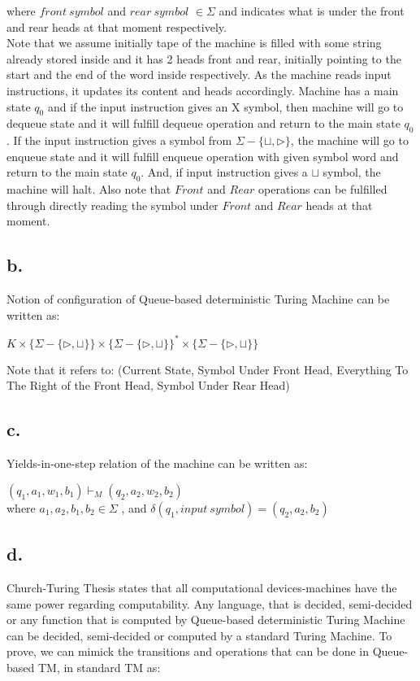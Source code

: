 \documentclass[12pt]{article}
\begin{document}
where $front \ symbol$ and $rear \ symbol$ $\in \Sigma$ and indicates what is under the front and rear heads at that moment respectively. \\

Note that we assume initially tape of the machine is filled with some string already stored inside and it has 2 heads front and rear, initially pointing to the start and the end of the word inside respectively. As the machine reads input instructions, it updates its content and heads accordingly. Machine has a main state $q_0$ and if the input instruction gives an X symbol, then machine will go to dequeue state and it will fulfill dequeue operation and return to the main state $q_0$. If the input instruction gives a symbol from $\Sigma - \{\sqcup,\triangleright\}$, the machine will go to enqueue state and it will fulfill enqueue operation with given symbol word and return to the main state $q_0$. And, if input instruction gives a $\sqcup$ symbol, the machine will halt. Also note that $Front$ and $Rear$ operations can be fulfilled through directly reading the symbol under $Front$ and $Rear$ heads at that moment.

\subsection*{b.}
Notion of configuration of Queue-based deterministic Turing Machine can be written as: \\
\begin{center}
$K \times \{\Sigma - \{\triangleright ,\sqcup \} \} \times \{\Sigma - \{\triangleright ,\sqcup \} \}^* \times \{\Sigma - \{\triangleright ,\sqcup \} \}$
\end{center}
Note that it refers to: (Current State, Symbol Under Front Head, Everything To The Right of the Front Head, Symbol Under Rear Head)
\subsection*{c.}
Yields-in-one-step relation of the machine can be written as: \\
\begin{center}
$(q_1,a_1,w_1,b_1) \vdash_M (q_2,a_2,w_2,b_2)$ \\
where $a_1,a_2,b_1,b_2\in \Sigma$ , and $\delta(q_1,input \ symbol) = (q_2,a_2,b_2)$
\end{center}

\subsection*{d.}
Church-Turing Thesis states that all computational devices-machines have the same power regarding computability. Any language, that is decided, semi-decided or any function that is computed by Queue-based deterministic Turing Machine can be decided, semi-decided or computed by a standard Turing Machine. To prove, we can mimick the transitions and operations that can be done in Queue-based TM, in standard TM as: \\
\end{document}
